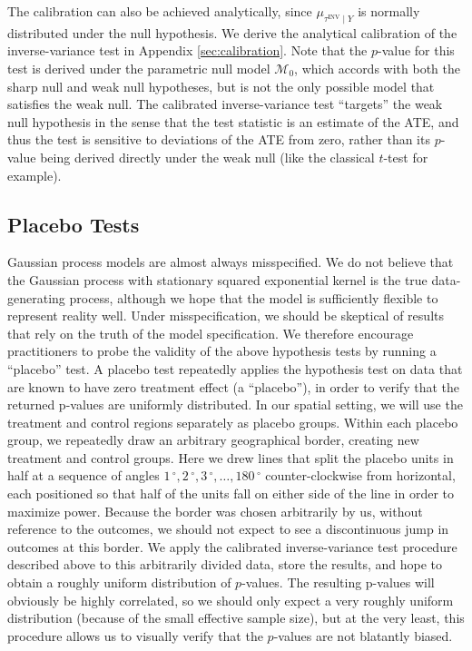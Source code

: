 \documentclass[letter,12pt]{article}
\newcommand{\invvar}{\tau^{\mathrm{INV}}}
\newcommand{\modnull}{\mathscr{M}_0}
\newcommand{\degree}{{\,^\circ}}
\begin{document}
The calibration can also be achieved analytically, since \(\mu_{\invvar \mid Y}\) is normally distributed under the null hypothesis.
We derive the analytical calibration of the inverse-variance test in Appendix \ref{sec:calibration}.
Note that the \(p\)-value for this test is derived under the parametric null model \(\modnull\), which accords with both the sharp null and weak null hypotheses, but is not the only possible model that satisfies the weak null.
The calibrated inverse-variance test “targets” the weak null hypothesis in the sense that the test statistic is an estimate of the ATE, and thus the test is sensitive to deviations of the ATE from zero, rather than its \(p\)-value being derived directly under the weak null (like the classical \(t\)-test for example).

\label{eq:calib_test}

\hypertarget{placebo-tests}{%
\subsection{Placebo Tests}\label{placebo-tests}}

\label{sec:placebo}
Gaussian process models are almost always misspecified.
We do not believe that the Gaussian process with stationary squared exponential kernel is the true data-generating process, although we hope that the model is sufficiently flexible to represent reality well.
Under misspecification, we should be skeptical of results that rely on the truth of the model specification.
We therefore encourage practitioners to probe the validity of the above hypothesis tests by running a ``placebo'' test.
A placebo test repeatedly applies the hypothesis test on data that are known to have zero treatment effect (a ``placebo''),
in order to verify that the returned p-values are uniformly distributed.
In our spatial setting, we will use the treatment and control regions separately as placebo groups.
Within each placebo group, we repeatedly draw an arbitrary geographical border, creating new treatment and control groups.
Here we drew lines that split the placebo units in half at a sequence of angles \(1\degree,2\degree,3\degree,\dotsc,180\degree\) counter-clockwise from horizontal, each positioned so that half of the units fall on either side of the line in order to maximize power.
Because the border was chosen arbitrarily by us, without reference to the outcomes, we should not expect to see a discontinuous jump in outcomes at this border.
We apply the calibrated inverse-variance test procedure described above to this arbitrarily divided data, store the results, and hope to obtain a roughly uniform distribution of \(p\)-values.
The resulting p-values will obviously be highly correlated, so we should only expect a very roughly uniform distribution (because of the small effective sample size), but at the very least, this procedure allows us to visually verify that the \(p\)-values are not blatantly biased.
\end{document}
